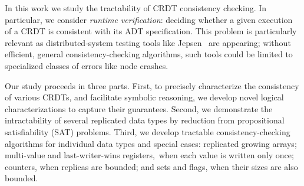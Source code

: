 In this work we study the tractability of CRDT consistency checking. In particular, we consider \emph{runtime verification}: deciding whether a given execution of a CRDT is consistent with its ADT specification. This problem is particularly relevant as distributed-system testing tools like Jepsen~\cite{MISC:Jepsen} are appearing; without efficient, general consistency-checking algorithms, such tools could be limited to specialized classes of errors like node crashes.

Our study proceeds in three parts.
First, to precisely characterize the consistency of various CRDTs, and facilitate symbolic reasoning, we develop novel logical characterizations to capture their guarantees.
Second, we demonstrate the intractability of several replicated data types by reduction from propositional satisfiability (SAT) problems.
Third, we develop tractable consistency-checking algorithms for individual data types and special cases: replicated growing arrays; multi-value and last-writer-wins registers, when each value is written only once; counters, when replicas are bounded; and sets and flags, when their sizes are also bounded.


